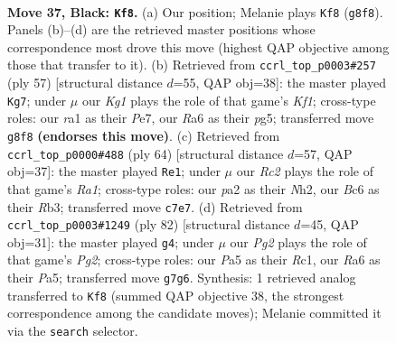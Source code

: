 \documentclass[11pt]{article}
\begin{document}
\clearpage

\begin{figure}[p]\centering
\begin{subfigure}{0.46\textwidth}\centering
\resizebox{\linewidth}{!}{%
\newchessgame
\chessboard[
  setfen={6k1/2r2ppp/rnbN4/p3p1P1/8/1P2P1R1/P5PP/RN2K3 b - - 3 37},
  showmover=false,
  pgfstyle=straightmove, color=movearrow, markmove={g8-f8}
]}
\caption{}
\end{subfigure}\hfill
\begin{subfigure}{0.46\textwidth}\centering
\resizebox{\linewidth}{!}{%
\newchessgame
\chessboard[
  setfen={r4k2/pp2pp2/6p1/2nPNbP1/3R4/4R3/P3PPBK/2r5 b - - 2 29},
  showmover=false,
  pgfstyle=straightmove, color=movearrow, markmove={f8-g7}
]}
\caption{}
\end{subfigure}
\\[4pt]
\begin{subfigure}{0.46\textwidth}\centering
\resizebox{\linewidth}{!}{%
\newchessgame
\chessboard[
  setfen={4rr1k/6p1/p4p1p/2p5/2P1n1P1/PRP4P/5PKN/R7 w - - 0 33},
  showmover=false,
  pgfstyle=straightmove, color=movearrow, markmove={a1-e1}
]}
\caption{}
\end{subfigure}\hfill
\begin{subfigure}{0.46\textwidth}\centering
\resizebox{\linewidth}{!}{%
\newchessgame
\chessboard[
  setfen={r4r2/1R3ppk/p1N1p3/P2p1n1p/3P1P2/1P5P/6P1/2R3K1 w - - 2 42},
  showmover=false,
  pgfstyle=straightmove, color=movearrow, markmove={g2-g4}
]}
\caption{}
\end{subfigure}
\caption{\textbf{Move 37, Black: \texttt{Kf8}.} (a) Our position; Melanie plays \texttt{Kf8} (\texttt{g8f8}). Panels (b)--(d) are the retrieved master positions whose correspondence most drove this move (highest QAP objective among those that transfer to it). (b) Retrieved from \texttt{ccrl\_top\_p0003\#257} (ply 57) [structural distance $d$=55, QAP obj=38]: the master played \texttt{Kg7}; under $\mu$ our \emph{Kg1} plays the role of that game's \emph{Kf1}; cross-type roles: our \emph{r}a1 as their \emph{P}e7, our \emph{R}a6 as their \emph{p}g5; transferred move \texttt{g8f8} \textbf{(endorses this move)}. (c) Retrieved from \texttt{ccrl\_top\_p0000\#488} (ply 64) [structural distance $d$=57, QAP obj=37]: the master played \texttt{Re1}; under $\mu$ our \emph{Rc2} plays the role of that game's \emph{Ra1}; cross-type roles: our \emph{p}a2 as their \emph{N}h2, our \emph{B}c6 as their \emph{R}b3; transferred move \texttt{c7e7}. (d) Retrieved from \texttt{ccrl\_top\_p0003\#1249} (ply 82) [structural distance $d$=45, QAP obj=31]: the master played \texttt{g4}; under $\mu$ our \emph{Pg2} plays the role of that game's \emph{Pg2}; cross-type roles: our \emph{P}a5 as their \emph{R}c1, our \emph{R}a6 as their \emph{P}a5; transferred move \texttt{g7g6}. Synthesis: 1 retrieved analog transferred to \texttt{Kf8} (summed QAP objective 38, the strongest correspondence among the candidate moves); Melanie committed it via the \texttt{search} selector.}
\label{fig:thought-m73}
\end{figure}
\end{document}

